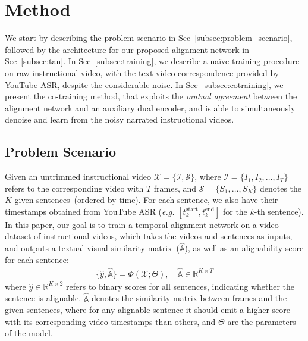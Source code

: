 \vspace{-1mm}
\section{Method}
\vspace{-1mm}
We start by describing the problem scenario in Sec~\ref{subsec:problem_scenario}, 
followed by the architecture for our proposed alignment network in Sec~\ref{subsec:tan}. 
In Sec~\ref{subsec:training}, we describe a na\"ive training procedure on raw instructional video,
with the text-video correspondence provided by YouTube ASR, despite the considerable noise.
In Sec~\ref{subsec:cotraining}, 
we present the co-training method, 
that exploits the {\em mutual agreement} between the alignment network 
and an auxiliary dual encoder,
and is able to simultaneously denoise and learn 
from the noisy narrated instructional videos.

\vspace{-1mm}
\subsection{Problem Scenario}
\vspace{-1mm}
\label{subsec:problem_scenario}
Given an untrimmed instructional video $\mathcal{X} = \{\mathcal{I}, \mathcal{S}\}$, 
where $\mathcal{I} = \{I_1, I_2, \dots, I_T\}$ refers to the corresponding video with $T$ frames, 
and $\mathcal{S} = \{S_1, \dots, S_K\}$ 
denotes the $K$ given sentences~(ordered by time). 
For each sentence, we also have their timestamps obtained from YouTube ASR 
({\em e.g.} $[t_k^{\text{start}}, t_k^{\text{end}}]$ for the $k$-th sentence).
In this paper, our goal is to train a temporal alignment network on a video dataset of instructional videos,
which takes the videos and sentences as inputs, and outputs a textual-visual similarity matrix~($\hat{\mathbb{A}}$),
as well as an alignability score for each sentence:
\vspace{-3mm}
\begin{align}
    \{ \hat{y}, \hat{\mathbb{A}} \} = \Phi(\mathcal{X}; \Theta),\quad \hat{\mathbb{A}} \in \mathbb{R}^{K \times T}
\end{align}
where $\hat{y} \in \mathbb{R}^{K \times 2}$ refers to binary scores for all sentences, 
indicating whether the sentence is alignable.
$\hat{\mathbb{A}}$ denotes the similarity matrix between frames and the given sentences, 
where for any alignable sentence it should emit a higher score with its corresponding video timestamps than others,
and $\Theta$ are the parameters of the model.

